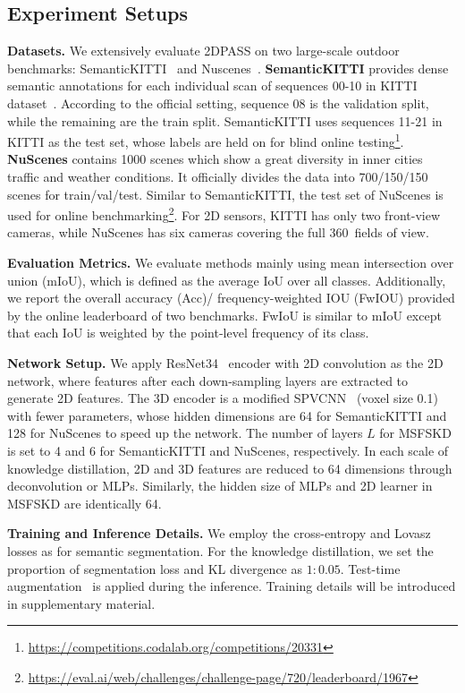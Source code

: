 \documentclass[runningheads]{llncs}
\begin{document}
	\subsection{Experiment Setups}
	\noindent\textbf{Datasets. }
We extensively evaluate 2DPASS on two large-scale outdoor benchmarks: SemanticKITTI~\cite{behley2019semantickitti} and Nuscenes~\cite{nuscenes}. \textbf{SemanticKITTI} provides dense semantic annotations for each individual scan of sequences 00-10 in KITTI dataset~\cite{geiger2012cvpr}. 
According to the official setting, sequence 08 is the validation split, while the remaining are the train split.
SemanticKITTI uses sequences 11-21 in KITTI as the test set, whose labels are held on for blind online testing\footnote{\url{https://competitions.codalab.org/competitions/20331}}.
\textbf{NuScenes} contains 1000 scenes which show a great diversity in inner cities traffic and weather conditions. It officially divides the data into 700/150/150 scenes for train/val/test. 
Similar to SemanticKITTI, the test set of NuScenes is used for online benchmarking\footnote{\url{https://eval.ai/web/challenges/challenge-page/720/leaderboard/1967}}.
For 2D sensors, KITTI has only two front-view cameras, while NuScenes has six cameras covering the full 360\degree~fields of view.
	
	\noindent\textbf{Evaluation Metrics.} 
	We evaluate methods mainly using mean intersection over union (mIoU), which is defined as the average IoU over all classes. 
Additionally, we report the overall accuracy (Acc)/ frequency-weighted IOU (FwIOU) provided by the online leaderboard of two benchmarks.
FwIoU is similar to mIoU except that each IoU is weighted by the point-level frequency of its class.
	
	\noindent\textbf{Network Setup.} 
We apply ResNet34~\cite{he2016deep} encoder with 2D convolution as the 2D network, where features after each down-sampling layers are extracted to generate 2D features.
The 3D encoder is a modified SPVCNN~\cite{tang2020searching} (voxel size 0.1) with fewer parameters, whose hidden dimensions are 64 for SemanticKITTI and 128 for NuScenes to speed up the network.
The number of layers $L$ for MSFSKD is set to 4 and 6 for SemanticKITTI and NuScenes, respectively.
In each scale of knowledge distillation, 2D and 3D features are reduced to 64 dimensions through deconvolution or MLPs.
Similarly, the hidden size of MLPs and 2D learner in MSFSKD are identically 64.
	
	\noindent\textbf{Training and Inference Details.} 
	We employ the cross-entropy and Lovasz losses as \cite{zhou2020cylinder3d} for semantic segmentation. 
For the knowledge distillation, we set the proportion of segmentation loss and KL divergence as $1:0.05$.
Test-time augmentation~\cite{zhou2020cylinder3d} is applied during the inference.
Training details will be introduced in supplementary material.
\end{document}
